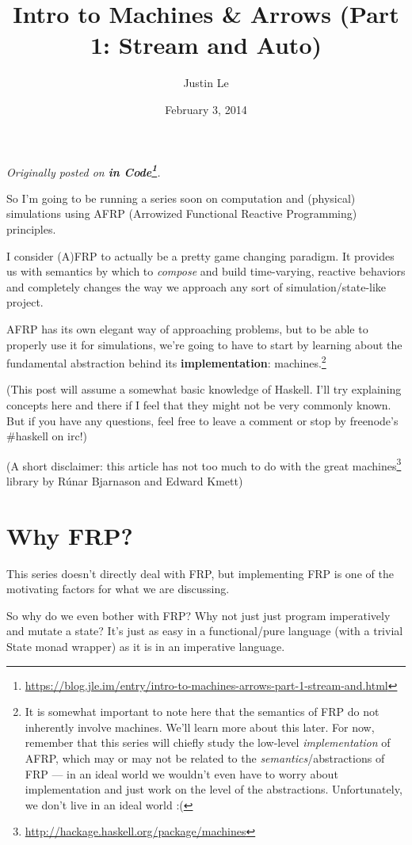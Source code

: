 \documentclass[]{article}
\title{Intro to Machines \& Arrows (Part 1: Stream and Auto)}
\author{Justin Le}
\date{February 3, 2014}
\renewcommand{\href}[2]{#2\footnote{\url{#1}}}
\begin{document}
\maketitle

\emph{Originally posted on
\textbf{\href{https://blog.jle.im/entry/intro-to-machines-arrows-part-1-stream-and.html}{in
Code}}.}

So I'm going to be running a series soon on computation and (physical)
simulations using AFRP (Arrowized Functional Reactive Programming) principles.

I consider (A)FRP to actually be a pretty game changing paradigm. It provides us
with semantics by which to \emph{compose} and build time-varying, reactive
behaviors and completely changes the way we approach any sort of
simulation/state-like project.

AFRP has its own elegant way of approaching problems, but to be able to properly
use it for simulations, we're going to have to start by learning about the
fundamental abstraction behind its \textbf{implementation}: machines.\footnote{It
  is somewhat important to note here that the semantics of FRP do not inherently
  involve machines. We'll learn more about this later. For now, remember that
  this series will chiefly study the low-level \emph{implementation} of AFRP,
  which may or may not be related to the \emph{semantics}/abstractions of FRP
  --- in an ideal world we wouldn't even have to worry about implementation and
  just work on the level of the abstractions. Unfortunately, we don't live in an
  ideal world :(}

(This post will assume a somewhat basic knowledge of Haskell. I'll try
explaining concepts here and there if I feel that they might not be very
commonly known. But if you have any questions, feel free to leave a comment or
stop by freenode's \#haskell on irc!)

(A short disclaimer: this article has not too much to do with the great
\href{http://hackage.haskell.org/package/machines}{machines} library by Rúnar
Bjarnason and Edward Kmett)

\section{Why FRP?}\label{why-frp}

This series doesn't directly deal with FRP, but implementing FRP is one of the
motivating factors for what we are discussing.

So why do we even bother with FRP? Why not just just program imperatively and
mutate a state? It's just as easy in a functional/pure language (with a trivial
State monad wrapper) as it is in an imperative language.
\end{document}
